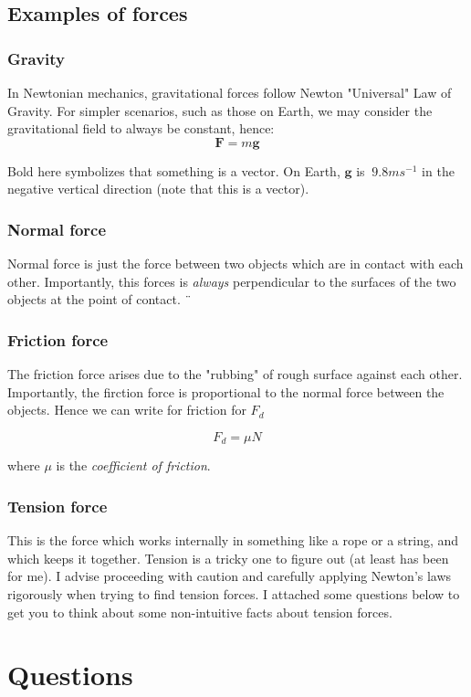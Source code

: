 \documentclass{article}
\begin{document}
\subsection{Examples of forces}
\subsubsection{Gravity}
In Newtonian mechanics, gravitational forces follow Newton "Universal" Law of Gravity. For simpler scenarios, such as those on Earth, we may consider the gravitational field to always be constant, hence:
\[\boldsymbol{F} = m \boldsymbol{g}\]

Bold here symbolizes that something is a vector. On Earth, $\boldsymbol{g}$ is $~9.8 m s^{-1}$ in the negative vertical direction (note that this is a vector).

\subsubsection{Normal force}
Normal force is just the force between two objects which are in contact with each other. Importantly, this forces is \textit{always} perpendicular to the surfaces of the two objects at the point of contact. ¨

\subsubsection{Friction force}
The friction force arises due to the "rubbing" of rough surface against each other. Importantly, the firction force is proportional to the normal force between the objects. Hence we can write for friction for $F_d$

\[F_d = \mu N\]

where $\mu$ is the \textit{coefficient of friction}.

\subsubsection{Tension force}
This is the force which works internally in something like a rope or a string, and which keeps it together. Tension is a tricky one to figure out (at least has been for me). I advise proceeding with caution and carefully applying Newton's laws rigorously when trying to find tension forces. I attached some questions below to get you to think about some non-intuitive facts about tension forces.

\section{Questions}
\end{document}
